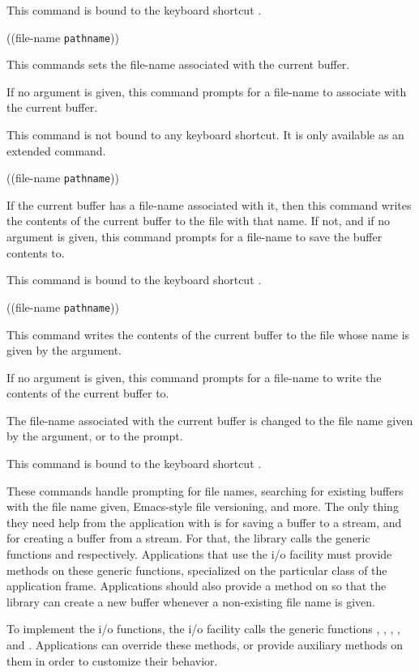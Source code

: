 This command is bound to the keyboard shortcut .

 {((file-name
  \texttt{pathname}))}

This commands sets the file-name associated with the current buffer.

If no argument is given, this command prompts for a file-name to
associate with the current buffer.

This command is not bound to any keyboard shortcut.  It is only
available as an extended command.

 {((file-name \texttt{pathname}))}

If the current buffer has a file-name associated with it, then this
command writes the contents of the current buffer to the file with
that name.  If not, and if no argument is given, this command prompts
for a file-name to save the buffer contents to.

This command is bound to the keyboard shortcut .

 {((file-name \texttt{pathname}))}

This command writes the contents of the current buffer to the file
whose name is given by the argument.

If no argument is given, this command prompts for a file-name to
write the contents of the current buffer to.

The file-name associated with the current buffer is changed to the
file name given by the argument, or to the prompt.

This command is bound to the keyboard shortcut .

These commands handle prompting for file names, searching for existing
buffers with the file name given, Emacs-style file versioning, and
more.  The only thing they need help from the application with is for
saving a buffer to a stream, and for creating a buffer from a stream.
For that, the \sysname{} library calls the generic functions
 and
 respectively.
Applications that use the \sysname{} i/o facility must provide methods
on these generic functions, specialized on the particular class of the
application frame.  Applications should also provide a method on
 so that the \sysname{}
library can create a new buffer whenever a non-existing file name is
given.

To implement the i/o functions, the \sysname{} i/o facility calls the
generic functions ,
,
,
, and
.  Applications can override these
methods, or provide auxiliary methods on them in order to customize
their behavior.
